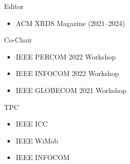 \begin{experiences}
  \service
    {Editor}{
      \begin{itemize}
        \item ACM XRDS Magazine (2021--2024)
      \end{itemize}
    }
  \emptySeparator

  \service
    {Co-Chair}{
      \begin{itemize}
        \item IEEE PERCOM 2022 Workshop
        \item IEEE INFOCOM 2022 Workshop
        \item IEEE GLOBECOM 2021 Workshop
      \end{itemize}
    }
  \emptySeparator

  \service
    {TPC}{
      \begin{itemize}
        \item IEEE ICC
        \item IEEE WiMob
        \item IEEE INFOCOM
    \end{itemize}
    }
\end{experiences}

